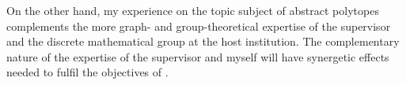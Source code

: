 
On the other hand,
my experience on the topic subject of abstract polytopes 
complements the more graph- and group-theoretical expertise of
the supervisor and the discrete mathematical group at the host institution.
The complementary nature of the expertise of the supervisor and myself
will have synergetic effects needed to fulfil the objectives of \ourp.




